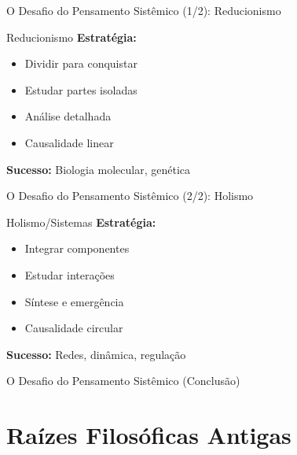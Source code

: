 \begin{frame}{O Desafio do Pensamento Sistêmico (1/2): Reducionismo}
\begin{center}
\begin{alertblock}{Reducionismo}
\textbf{Estratégia:}
\begin{itemize}
    \item Dividir para conquistar
    \item Estudar partes isoladas
    \item Análise detalhada
    \item Causalidade linear
\end{itemize}

\vspace{0.2cm}
\textbf{Sucesso:} Biologia molecular, genética
\end{alertblock}
\end{center}
\end{frame}

\begin{frame}{O Desafio do Pensamento Sistêmico (2/2): Holismo}
\begin{center}
\begin{exampleblock}{Holismo/Sistemas}
\textbf{Estratégia:}
\begin{itemize}
    \item Integrar componentes
    \item Estudar interações
    \item Síntese e emergência
    \item Causalidade circular
\end{itemize}

\vspace{0.2cm}
\textbf{Sucesso:} Redes, dinâmica, regulação
\end{exampleblock}
\end{center}
\end{frame}

\begin{frame}{O Desafio do Pensamento Sistêmico (Conclusão)}
\end{frame}

\section{Raízes Filosóficas Antigas}

